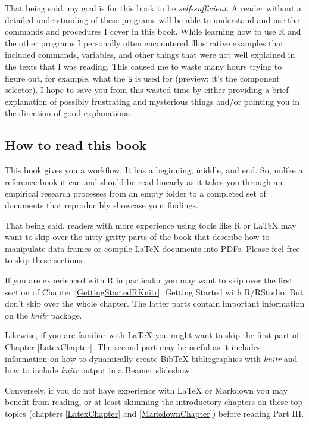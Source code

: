 \documentclass[krantz1]{krantz}
\begin{document}
That being said, my goal is for this book to be {\emph{self-sufficient}}. A reader without a detailed understanding of these programs will be able to understand and use the commands and procedures I cover in this book. While learning how to use R and the other programs I personally often encountered illustrative examples that included commands, variables, and other things that were not well explained in the texts that I was reading. This caused me to waste many hours trying to figure out, for example, what the \texttt{\$} is used for (preview: it's the component selector). I hope to save you from this wasted time by either providing a brief explanation of possibly frustrating and mysterious things and/or pointing you in the direction of good explanations.

\subsection{How to read this book}

This book gives you a workflow. It has a beginning, middle, and end. So, unlike a reference book it can and should be read linearly as it takes you through an empirical research processes from an empty folder to a completed set of documents that reproducibly showcase your findings.

That being said, readers with more experience using tools like R or LaTeX may want to skip over the nitty-gritty parts of the book that describe how to manipulate data frames or compile LaTeX documents into PDFs. Please feel free to skip these sections.

If you are experienced with R in particular you may want to skip over the first section of Chapter \ref{GettingStartedRKnitr}: Getting Started with R/RStudio. But don't skip over the whole chapter. The latter parts contain important information on the {\emph{knitr}} package. 

Likewise, if you are familiar with LaTeX you might want to skip the first part of Chapter \ref{LatexChapter}. The second part may be useful as it includes information on how to dynamically create BibTeX bibliographies with \emph{knitr} and how to include \emph{knitr} output in a Beamer slideshow.

Conversely, if you do not have experience with LaTeX or Markdown you may benefit from reading, or at least skimming the introductory chapters on these top topics (chapters \ref{LatexChapter} and \ref{MarkdownChapter}) before reading Part III.
\end{document}
